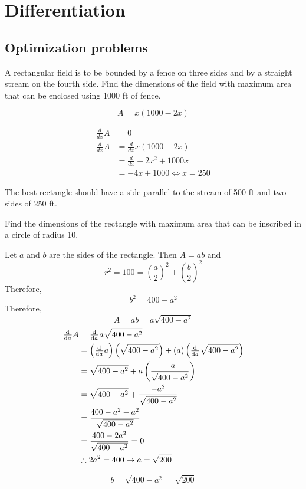 \documentclass[a4paper, titlepage]{article}
\begin{document}
\section{Differentiation}

\subsection{Optimization problems}

\begin{Exercise}
A rectangular field is to be bounded by a fence on three sides
and by a straight stream on the fourth side.
Find the dimensions of the field with maximum area that can be enclosed
using 1000 ft of fence.
\cite{anton-bivens-davis}
\end{Exercise}

\begin{Answer}
\[A = x \left( 1000 - 2x \right)\]

\begin{align*}
    \frac{d}{dx} A &= 0 \\
    \frac{d}{dx} A &= \frac{d}{dx} x \left( 1000 - 2x \right) \\
    &= \frac{d}{dx} -2x^2 + 1000x \\
    &= -4x + 1000
    \iff x = 250
\end{align*}

The best rectangle should have a side parallel to the stream of 500 ft
and two sides of 250 ft.
\end{Answer}

\begin{Exercise}
Find the dimensions of the rectangle with maximum area
that can be inscribed in a circle of radius 10.
\cite{anton-bivens-davis}
\end{Exercise}

\begin{Answer}
Let \(a\) and \(b\) are the sides of the rectangle. Then \(A = ab\) and
\[r^2 = 100 = \left( \frac{a}{2} \right)^2 + \left( \frac{b}{2} \right)^2\]
Therefore,
\[b^2 = 400 - a^2\]
Therefore,
\[A = ab = a \sqrt{400 - a^2}\]
\begin{align*}
    \od{}{a} A &= \od{}{a} a \sqrt{400 - a^2} \\
    &= \left( \od{}{a} a \right) \left( \sqrt{400 - a^2} \right)
      + \left( a \right) \left( \od{}{a} \sqrt{400 - a^2} \right) \\
    &= \sqrt{400 - a^2} + a \left(\frac{-a}{\sqrt{400 - a^2}} \right) \\
    &= \sqrt{400 - a^2} + \frac{-a^2}{\sqrt{400 - a^2}} \\
    &= \frac{400 - a^2 - a^2}{\sqrt{400 - a^2}} \\
    &= \frac{400 - 2a^2}{\sqrt{400 - a^2}} = 0 \\
    &\therefore 2a^2 = 400 \rightarrow a = \sqrt{200} \\
\end{align*}

\[b = \sqrt{400 - a^2} = \sqrt{200}\]
\end{Answer}
\end{document}
